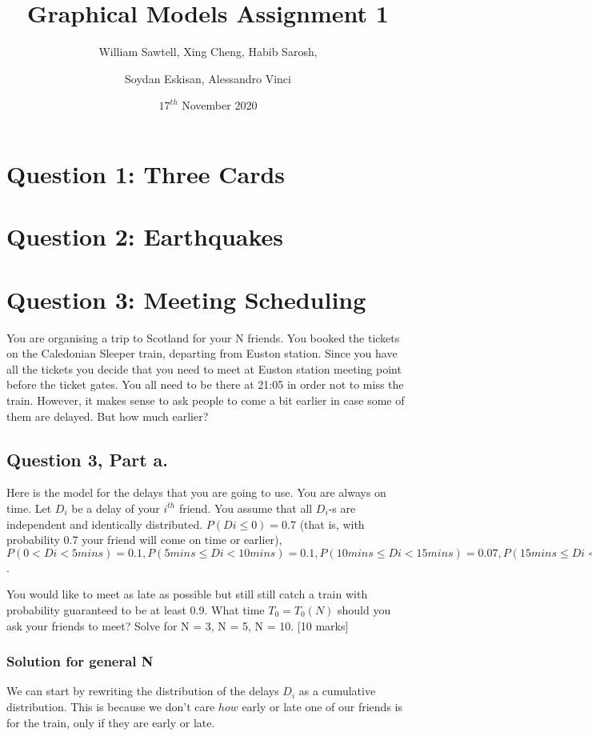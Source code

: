\documentclass{article}
\title{Graphical Models Assignment 1}
\author{William Sawtell, Xing Cheng, Habib Sarosh, \and Soydan Eskisan, Alessandro Vinci}
\date{$17^{th}$ November 2020}
\begin{document}
\maketitle

\section{Question 1: Three Cards}


\section{Question 2: Earthquakes}


\section{Question 3: Meeting Scheduling}
You are organising a trip to Scotland for your N friends. You booked the tickets on the Caledonian Sleeper train, departing from Euston station. Since you have all the tickets you decide that you need to meet at Euston station meeting point before the ticket gates. You all need to be there at 21:05 in order not to miss the train. However, it makes sense to ask people to come a bit earlier in case some of them are delayed. But how much earlier?

\subsection{Question 3, Part a.}
Here is the model for the delays that you are going to use. You are always on time. Let $D_i$ be a delay of your $i^{th}$ friend. You assume that all $D_i$-s are independent and identically distributed. $P(Di \leq 0) = 0.7$ (that is, with probability 0.7 your friend will come on time or earlier), $P(0 < Di < 5 mins) = 0.1, P(5 mins \leq Di < 10 mins) = 0.1, P(10 mins \leq Di < 15 mins) = 0.07, P(15 mins \leq Di < 20 mins) = 0.02, P(20 mins \leq Di) = 0.01$. 

\newline
\noindent
You would like to meet as late as
possible but still still catch a train with probability guaranteed to be
at least 0.9. What time $T_0 = T_0(N)$ should you ask your friends to meet? Solve for N = 3, N = 5, N = 10. [10 marks]

\subsubsection{Solution for general N}
We can start by rewriting the distribution of the delays $D_i$ as a cumulative distribution. This is because we don't care $how$ early or late one of our friends is for the train, only if they are early or late.
\newline
\end{document}
